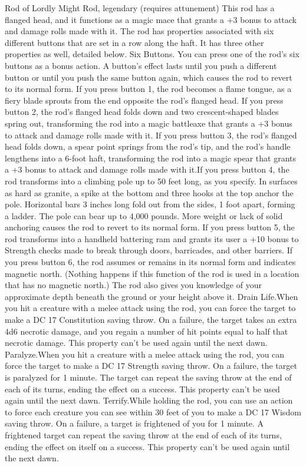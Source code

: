 Rod of Lordly Might
Rod, legendary (requires attunement) This rod has a flanged head, and it functions as a magic mace that grants a +3 bonus to attack and damage rolls made with it. The rod has properties associated with six different buttons that are set in a row along the haft. It has three other properties as well, detailed below.
Six Buttons. You can press one of the rod's six buttons as a bonus action. A button's effect lasts until you push a different button or until you push the same button again, which causes the rod to revert to its normal form.  If you press
button 1, the rod becomes a flame tongue, as a fiery blade sprouts from the end opposite the rod's flanged head.  If you press
button 2, the rod's flanged head folds down and two crescent-shaped blades spring out, transforming the rod into a magic battleaxe that grants a +3 bonus to attack and damage rolls made with it.  If you press
button 3, the rod's flanged head folds down, a spear point springs from the rod's tip, and the rod's handle lengthens into a 6-foot haft, transforming the rod into a magic spear that grants a +3 bonus to attack and damage rolls made with it.If you press
button 4, the rod transforms into a climbing pole up to 50 feet long, as you specify. In surfaces as hard as granite, a spike at the bottom and three hooks at the top anchor the pole. Horizontal bars 3 inches long fold out from the sides, 1 foot apart, forming a ladder. The pole can bear up to 4,000 pounds. More weight or lack of solid anchoring causes the rod to revert to its normal form.
If you press
button 5, the rod transforms into a handheld battering ram and grants its user a +10 bonus to Strength checks made to break through doors, barricades, and other barriers.
If you press
button 6, the rod assumes or remains in its normal form and indicates magnetic north. (Nothing happens if this function of the rod is used in a location that has no magnetic north.) The rod also gives you knowledge of your approximate depth beneath the ground or your height above it.
Drain Life.When you hit a creature with a melee attack using the
rod, you can force the target to make a DC 17 Constitution saving throw. On a failure, the target takes an extra 4d6 necrotic damage, and you regain a number of hit points equal to half that necrotic damage. This property can't be used again until the next dawn.
Paralyze.When you hit a creature with a melee attack using the rod, you can force the target to make a DC 17 Strength saving throw. On a failure, the target is paralyzed for 1 minute. The target can repeat the saving throw at the end of each of its turns, ending the effect on a success. This property can't be used again until the next dawn.
Terrify.While holding the rod, you can use an action to force each creature you can see within 30 feet of you to make a DC 17 Wisdom saving throw. On a failure, a target is frightened of you for 1 minute. A frightened target can repeat the saving throw at the end of each of its turns, ending the effect on itself on a success. This property can't be used again until the next dawn.


